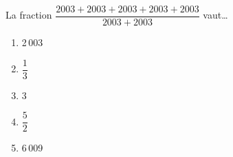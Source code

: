 La fraction $\dfrac{2003 + 2003 + 2003 + 2003 + 2003}{2003+2003}$ vaut\ldots
\begin{multicols}{5}
  \begin{enumerate}[A/]
  \item 2\,003
  \item $\dfrac13$
  \item 3
  \item $\dfrac52$
  \item 6\,009
  \end{enumerate}
\end{multicols}